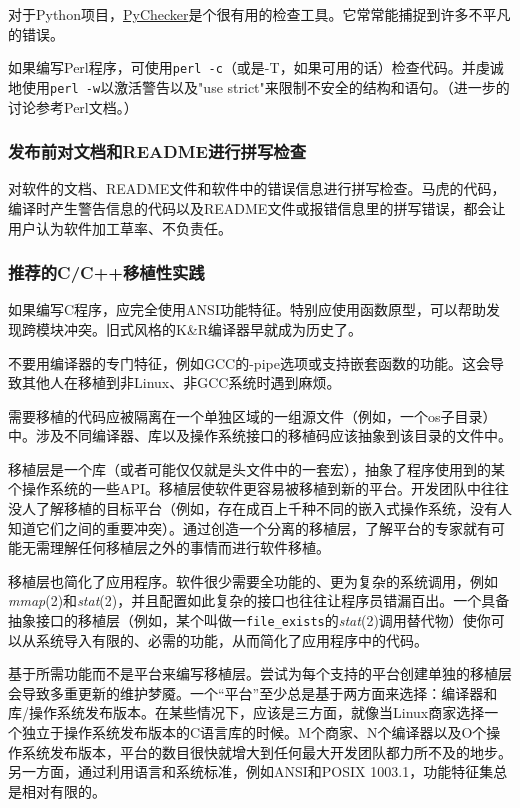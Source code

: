 \documentclass[12pt,oneside]{book}
\begin{document}
对于Python项目，\href{http://sourceforge.net/projects/pychecker}{PyChecker}是个很有用的检查工具。它常常能捕捉到许多不平凡的错误。

如果编写Perl程序，可使用\verb+perl -c+（或是-T，如果可用的话）检查代码。并虔诚地使用\verb+perl -w+以激活警告以及"use strict"来限制不安全的结构和语句。（进一步的讨论参考Perl文档。）

\subsubsection{发布前对文档和README进行拼写检查}
对软件的文档、README文件和软件中的错误信息进行拼写检查。马虎的代码，编译时产生警告信息的代码以及README文件或报错信息里的拼写错误，都会让用户认为软件加工草率、不负责任。

\subsubsection{推荐的C/C++移植性实践}
如果编写C程序，应完全使用ANSI功能特征。特别应使用函数原型，可以帮助发现跨模块冲突。旧式风格的K\&{}R编译器早就成为历史了。

不要用编译器的专门特征，例如GCC的-pipe选项或支持嵌套函数的功能。这会导致其他人在移植到非Linux、非GCC系统时遇到麻烦。

需要移植的代码应被隔离在一个单独区域的一组源文件（例如，一个os子目录）中。涉及不同编译器、库以及操作系统接口的移植码应该抽象到该目录的文件中。

移植层是一个库（或者可能仅仅就是头文件中的一套宏），抽象了程序使用到的某个操作系统的一些API。移植层使软件更容易被移植到新的平台。开发团队中往往没人了解移植的目标平台（例如，存在成百上千种不同的嵌入式操作系统，没有人知道它们之间的重要冲突）。通过创造一个分离的移植层，了解平台的专家就有可能无需理解任何移植层之外的事情而进行软件移植。

移植层也简化了应用程序。软件很少需要全功能的、更为复杂的系统调用，例如\textit{mmap}(2)和\textit{stat}(2)，并且配置如此复杂的接口也往往让程序员错漏百出。一个具备抽象接口的移植层（例如，某个叫做一\verb+file_exists+的\textit{stat}(2)调用替代物）使你可以从系统导入有限的、必需的功能，从而简化了应用程序中的代码。

基于所需功能而不是平台来编写移植层。尝试为每个支持的平台创建单独的移植层会导致多重更新的维护梦魇。一个“平台”至少总是基于两方面来选择：编译器和库/操作系统发布版本。在某些情况下，应该是三方面，就像当Linux商家选择一个独立于操作系统发布版本的C语言库的时候。M个商家、N个编译器以及O个操作系统发布版本，平台的数目很快就增大到任何最大开发团队都力所不及的地步。另一方面，通过利用语言和系统标准，例如ANSI和POSIX 1003.1，功能特征集总是相对有限的。
\end{document}

